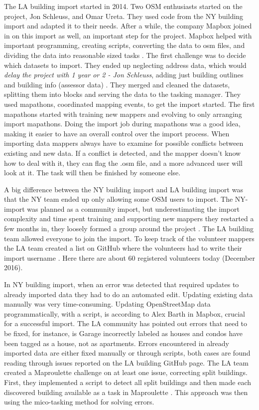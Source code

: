 The LA building import started in 2014. Two OSM enthusiasts started on the project, Jon Schleuss, and Omar Ureta. They used code from the NY building import and adapted it to their needs. After a while, the company Mapbox joined in on this import as well, an important step for the project. Mapbox helped with important programming, creating scripts, converting the data to osm files, and dividing the data into reasonable sized tasks \cite{Schleuss2016}. The first challenge was to decide which datasets to import. They ended up neglecting address data, which would \textit{delay the project with 1 year or 2 - Jon Schleuss}, adding just building outlines and building info (assessor data) \cite{Schleuss2016}. They merged and cleaned the datasets, splitting them into blocks and serving the data to the tasking manager. They used mapathons, coordinated mapping events, to get the import started. The first mapathons started with training new mappers and evolving to only arranging import mapathons. Doing the import job during mapathons was a good idea, making it easier to have an overall control over the import process. When importing data mappers always have to examine for possible conflicts between existing and new data. If a conflict is detected, and the mapper doesn't know how to deal with it, they can flag the .osm file, and a more advanced user will look at it. The task will then be finished by someone else. 

A big difference between the NY building import and LA building import was that the NY team ended up only allowing some OSM users to import. The NY-import was planned as a community import, but underestimating the import complexity and time spent training and supporting new mappers they restarted a few months in,  they loosely formed a group around the project \cite{Barth2014}. The LA building team allowed everyone to join the import. To keep track of the volunteer mappers the LA team created a list on GitHub where the volunteers had to write their import username \cite{Sambale2016a}. Here there are about 60 registered volunteers today (December 2016). 

In NY building import, when an error was detected that required updates to already imported data they had to do an automated edit. Updating existing data manually was very time-consuming. Updating OpenStreetMap data programmatically, with a script, is according to Alex Barth in Mapbox, crucial for a successful import.  The LA community has pointed out errors that need to be fixed, for instance, is Garage incorrectly labeled as houses and condos have been tagged as a house, not as apartments. Errors encountered in already imported data are either fixed manually or through scripts, both cases are found reading through issues reported on the LA building GitHub page. The LA team created a Maproulette challenge on at least one issue, correcting split buildings. First, they implemented a script to detect all split buildings and then made each discovered building available as a task in Maproulette \cite{Sambale2016a}. This approach was then using the mico-tasking method for solving errors.  

